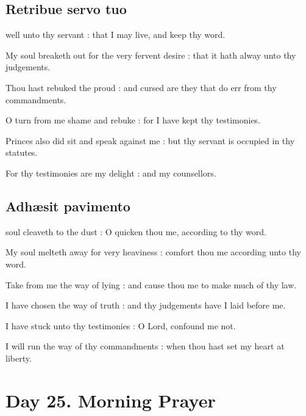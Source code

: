 \subsection{Retribue servo tuo}
 well unto thy servant : that I may live, and keep thy word.\par
{}
My soul breaketh out for the very fervent desire : that it hath alway unto thy judgements.\par
{}Thou hast rebuked the proud : and cursed are they that do err from thy commandments.\par
{}O turn from me shame and rebuke : for I have kept thy testimonies.\par
{}Princes also did sit and speak against me : but thy servant is occupied in thy statutes.\par
{}For thy testimonies are my delight : and my counsellors.\par

\subsection{Adh{\ae}sit pavimento}
 soul cleaveth to the dust : O quicken thou me, according to thy word.\par
{}
My soul melteth away for very heaviness : comfort thou me according unto thy word.\par
{}Take from me the way of lying : and cause thou me to make much of thy law.\par
{}I have chosen the way of truth : and thy judgements have I laid before me.\par
{}I have stuck unto thy testimonies : O Lord, confound me not.\par
{}I will run the way of thy commandments : when thou hast set my heart at liberty.\par

\section*{Day 25. Morning Prayer}

